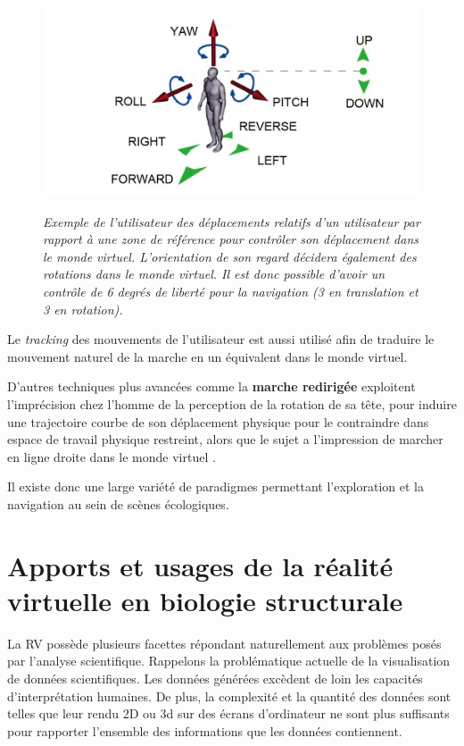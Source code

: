\begin{figure}[h]
 \centering
 {\includegraphics[width=0.8\linewidth]{./figures/ch3/HCNav}}
   \caption[Technique de navigation HCNav.]{\it Exemple de l'utilisateur des déplacements relatifs d'un utilisateur par rapport à une zone de référence pour contrôler son déplacement dans le monde virtuel. L'orientation de son regard décidera également des rotations dans le monde virtuel. Il est donc possible d'avoir un contrôle de 6 degrés de liberté pour la navigation (3 en translation et 3 en rotation).}
   \label{Fig:HCNAV}
 \hspace{0.3cm}
\end{figure}

Le \textit{tracking} des mouvements de l'utilisateur est aussi utilisé afin de traduire le mouvement naturel de la marche en un équivalent dans le monde virtuel. 

D'autres techniques plus avancées comme la \textbf{marche redirigée} exploitent l'imprécision chez l'homme de la perception de la rotation de sa tête, pour induire une trajectoire courbe de son déplacement physique pour le contraindre dans espace de travail physique restreint, alors que le sujet a l'impression de marcher en ligne droite dans le monde virtuel \cite{bruder_redirecting_2012}.

Il existe donc une large variété de paradigmes permettant l'exploration et la navigation au sein de scènes écologiques. 




\section{Apports et usages de la réalité virtuelle en biologie structurale} \label{RV_for_bio_struct}

La RV possède plusieurs facettes répondant naturellement aux problèmes posés par l'analyse scientifique. Rappelons la problématique actuelle de la visualisation de données scientifiques. Les données générées excèdent de loin les capacités d'interprétation humaines. De plus, la complexité et la quantité des données sont telles que leur rendu 2D ou 3d sur des écrans d'ordinateur ne sont plus suffisants pour rapporter l'ensemble des informations que les données contiennent. %

